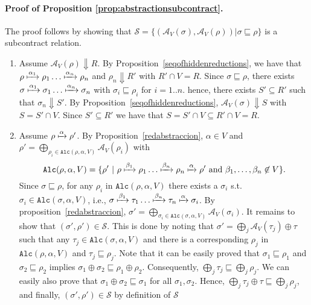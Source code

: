 \documentclass[submission,copyright,creativecommons]{eptcs}
\begin{document}
\paragraph{Proof of Proposition \ref{prop:abstractionsubcontract}.}
The proof follows by showing that $\mathcal{S}= \{(\mathcal{A}_V(\sigma),\mathcal{A}_V(\rho)) | \sigma \sqsubseteq \rho\}$ is a subcontract relation. 
\begin{enumerate}
 \item Assume $\mathcal{A}_V(\rho) \Downarrow R$. By Proposition~\ref{seqofhiddenreductions}, we have that
 $\rho\xmapsto{\alpha_1}\rho_1\ldots\xmapsto{\alpha_n}\rho_n$ and $\rho_n\Downarrow R'$ with $R'\cap V = R$.
 Since  $\sigma \sqsubseteq \rho$, there exists 
 $\sigma\xmapsto{\alpha_1}\sigma_1\ldots\xmapsto{\alpha_n}\sigma_n$ with $\sigma_i \sqsubseteq \rho_i$ for $i= 1..n$.
 hence, there exists $S'\subseteq R'$ such that $\sigma_n\Downarrow S'$. By Proposition~\ref{seqofhiddenreductions},
 $\mathcal{A}_V(\sigma) \Downarrow S$ with $S=S'\cap V$. Since $S'\subseteq R'$ we have that $S = S'\cap V \subseteq R'\cap V = R$.
 \item Assume $\rho\xmapsto{\alpha}\rho'$. By Proposition~\ref{redabstraccion},   
  $\alpha\in V$ and $\rho' = \bigoplus_{\rho_i\in \mathtt{Alc}(\rho,\alpha,V)} \mathcal{A}_V(\rho_i)$ with
 \[\mathtt{Alc}(\rho,\alpha,V) = \{\rho'\ |\ \rho\xmapsto{\beta_1}\rho_1\ldots\xmapsto{\beta_n}\rho_n\xmapsto{\alpha}\rho'\ \mbox{and}\ \beta_1,\ldots,\beta_n\not\in V\}.\]
 Since $\sigma \sqsubseteq \rho$, for any $\rho_i$ in $\mathtt{Alc}(\rho,\alpha,V)$ there exists 
 a $\sigma_i$ s.t. $\sigma_i\in\mathtt{Alc}(\sigma,\alpha,V)$, i.e., $\sigma\xmapsto{\beta_1}\tau_1\ldots\xmapsto{\beta_n}\tau_n\xmapsto{\alpha}\sigma_i$.
 By proposition~\ref{redabstraccion},
 $\sigma'= \bigoplus_{\sigma_i\in\mathtt{Alc}(\sigma,\alpha,V)} \mathcal{A}_V(\sigma_i)$.
 It remains to show that $(\sigma', \rho')\in \mathcal{S}$. This is done by noting that
 $\sigma' = \bigoplus_j\mathcal{A}_V(\tau_j) \oplus  \tau$ such that any $\tau_j \in \mathtt{Alc}(\sigma,\alpha,V)$ 
 and there is a corresponding $\rho_j$ in $\mathtt{Alc}(\rho,\alpha,V)$ and $\tau_j\sqsubseteq \rho_j$. Note that it can be easily proved that $\sigma_1 \sqsubseteq \rho_1$ and $\sigma_2 \sqsubseteq \rho_2$ implies $\sigma_1\oplus\sigma_2 \sqsubseteq\rho_1\oplus \rho_2$. Consequently,
 $\bigoplus_j \tau_j \sqsubseteq \bigoplus_j\rho_j$. We can easily also prove that $\sigma_1\oplus \sigma_2\sqsubseteq \sigma_1$ for all 
 $\sigma_1, \sigma_2$. Hence, $\bigoplus_j \tau_j \oplus \tau \sqsubseteq \bigoplus_j\rho_j$, and finally, $(\sigma',\rho')\in\mathcal{S}$ by definition of $\mathcal{S}$
\end{enumerate}
\end{document}
